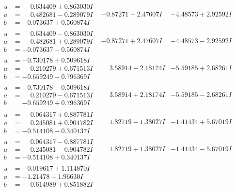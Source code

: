 \documentclass[1p]{elsarticle_modified}
\theoremstyle{definition}
\begin{document}
$$\begin{array}{c|c|c}
\begin{aligned}
u &= \phantom{-}0.634409 + 0.863030 I \\
a &= \phantom{-}0.482681 - 0.289079 I \\
b &= -0.073637 + 0.560874 I\end{aligned}
 & -0.87271 - 2.47607 I & -4.48573 + 2.92592 I \\ \hline\begin{aligned}
u &= \phantom{-}0.634409 - 0.863030 I \\
a &= \phantom{-}0.482681 + 0.289079 I \\
b &= -0.073637 - 0.560874 I\end{aligned}
 & -0.87271 + 2.47607 I & -4.48573 - 2.92592 I \\ \hline\begin{aligned}
u &= -0.730178 + 0.509618 I \\
a &= \phantom{-}0.210279 + 0.671513 I \\
b &= -0.659249 - 0.796369 I\end{aligned}
 & \phantom{-}3.58914 - 2.18174 I & -5.59185 + 2.68261 I \\ \hline\begin{aligned}
u &= -0.730178 - 0.509618 I \\
a &= \phantom{-}0.210279 - 0.671513 I \\
b &= -0.659249 + 0.796369 I\end{aligned}
 & \phantom{-}3.58914 + 2.18174 I & -5.59185 - 2.68261 I \\ \hline\begin{aligned}
u &= \phantom{-}0.064317 + 0.887781 I \\
a &= \phantom{-}0.245081 + 0.904782 I \\
b &= -0.514108 - 0.340137 I\end{aligned}
 & \phantom{-}1.82719 - 1.38027 I & -1.41434 + 5.67019 I \\ \hline\begin{aligned}
u &= \phantom{-}0.064317 - 0.887781 I \\
a &= \phantom{-}0.245081 - 0.904782 I \\
b &= -0.514108 + 0.340137 I\end{aligned}
 & \phantom{-}1.82719 + 1.38027 I & -1.41434 - 5.67019 I \\ \hline\begin{aligned}
u &= -0.019617 + 1.114870 I \\
a &= -1.21478 - 1.96630 I \\
b &= \phantom{-}0.614989 + 0.851882 I\end{aligned}

\end{array}$$
\end{document}
